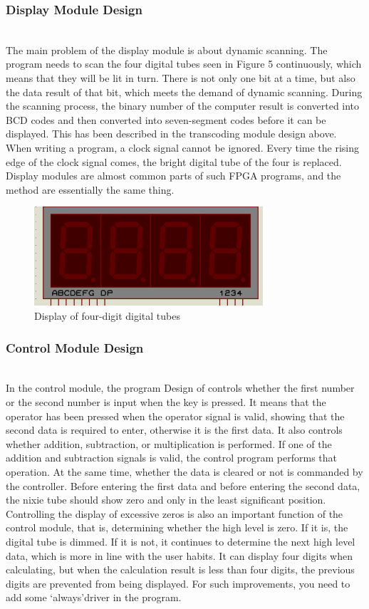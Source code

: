 \documentclass[conference,compsoc]{IEEEtran}
\begin{document}
\subsubsection{Display Module Design}
\hfill\\

The main problem of the display module is about dynamic scanning. The program needs to scan the four digital tubes seen in Figure 5 continuously, which means that they will be lit in turn. There is not only one bit at a time, but also the data result of that bit, which meets the demand of dynamic scanning. During the scanning process, the binary number of the computer result is converted into BCD codes and then converted into seven-segment codes before it can be displayed. This has been described in the transcoding module design above. When writing a program, a clock signal cannot be ignored. Every time the rising edge of the clock signal comes, the bright digital tube of the four is replaced. Display modules are almost common parts of such FPGA programs, and the method are essentially the same thing.
\begin{figure}[H]
	\centering
	\includegraphics[width=8.5cm]{fig6}
	\caption{Display of four-digit digital tubes}
	\label{Fig6}
\end{figure}

\subsubsection{Control Module Design}
\hfill\\

In the control module, the program Design of controls whether the first number or the second number is input when the key is pressed. It means that the operator has been pressed when the operator signal is valid, showing that the second data is required to enter, otherwise it is the first data. It also controls whether addition, subtraction, or multiplication is performed. If one of the addition and subtraction signals is valid, the control program performs that operation. At the same time, whether the data is cleared or not is commanded by the controller. Before entering the first data and before entering the second data, the nixie tube should show zero and only in the least significant position. Controlling the display of excessive zeros is also an important function of the control module, that is, determining whether the high level is zero. If it is, the digital tube is dimmed. If it is not, it continues to determine the next high level data, which is more in line with the user habits. It can display four digits when calculating, but when the calculation result is less than four digits, the previous digits are prevented from being displayed. For such improvements, you need to add some ‘always’driver in the program.
\end{document}
